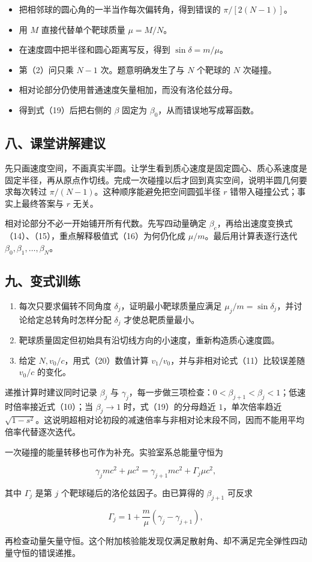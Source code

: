 \documentclass[12pt,a4paper,UTF8]{ctexart}
\newcommand{\tightlist}{\setlength{\itemsep}{0pt}\setlength{\parskip}{0pt}}
\begin{document}
\begin{itemize}
\tightlist
\item
  把相邻球的圆心角的一半当作每次偏转角，得到错误的 \(\pi/[2(N-1)]\)。
\item
  用 \(M\) 直接代替单个靶球质量 \(\mu=M/N\)。
\item
  在速度圆中把半径和圆心距离写反，得到 \(\sin\delta=m/\mu\)。
\item
  第（2）问只乘 \(N-1\) 次。题意明确发生了与 \(N\) 个靶球的 \(N\)
  次碰撞。
\item
  相对论部分仍使用普通速度矢量相加，而没有洛伦兹分母。
\item
  得到式（19）后把右侧的 \(\beta\) 固定为
  \(\beta_0\)，从而错误地写成幂函数。
\end{itemize}

\subsection{八、课堂讲解建议}\label{ux516bux8bfeux5802ux8bb2ux89e3ux5efaux8bae-7}

先只画速度空间，不画真实半圆。让学生看到质心速度是固定圆心、质心系速度是固定半径，再从原点作切线。完成一次碰撞以后才回到真实空间，说明半圆几何要求每次转过
\(\pi/(N-1)\)。这种顺序能避免把空间圆弧半径 \(r\)
错带入碰撞公式；事实上最终答案与 \(r\) 无关。

相对论部分不必一开始铺开所有代数。先写四动量确定
\(\beta_c\)，再给出速度变换式（14）、（15），重点解释极值式（16）为何仍化成
\(\mu/m\)。最后用计算表逐行迭代 \(\beta_0,\beta_1,\ldots,\beta_N\)。

\subsection{九、变式训练}\label{ux4e5dux53d8ux5f0fux8badux7ec3-7}

\begin{enumerate}
\def\labelenumi{\arabic{enumi}.}
\tightlist
\item
  每次只要求偏转不同角度 \(\delta_j\)，证明最小靶球质量应满足
  \(\mu_j/m=\sin\delta_j\)，并讨论给定总转角时怎样分配 \(\delta_j\)
  才使总靶质量最小。
\item
  靶球质量固定但初始具有沿切线方向的小速度，重新构造质心速度圆。
\item
  给定 \(N,v_0/c\)，用式（20）数值计算
  \(v_1/v_0\)，并与非相对论式（11）比较误差随 \(v_0/c\) 的变化。
\end{enumerate}

递推计算时建议同时记录 \(\beta_j\) 与
\(\gamma_j\)，每一步做三项检查：\(0<\beta_{j+1}<\beta_j<1\)；低速时倍率接近式（10）；当
\(\beta_j\to1\) 时，式（19）的分母趋近 \(1\)，单次倍率趋近
\(\sqrt{1-s^2}\)。这说明超相对论初段的减速倍率与非相对论末段不同，因而不能用平均倍率代替逐次迭代。

一次碰撞的能量转移也可作为补充。实验室系总能量守恒为

\[\gamma_jmc^2+\mu c^2
=\gamma_{j+1}mc^2+\Gamma_j\mu c^2,\]

其中 \(\Gamma_j\) 是第 \(j\) 个靶球碰后的洛伦兹因子。由已算得的
\(\beta_{j+1}\) 可反求

\[\Gamma_j=1+\frac m\mu(\gamma_j-\gamma_{j+1}),\]

再检查动量矢量守恒。这个附加核验能发现仅满足散射角、却不满足完全弹性四动量守恒的错误递推。
\end{document}
